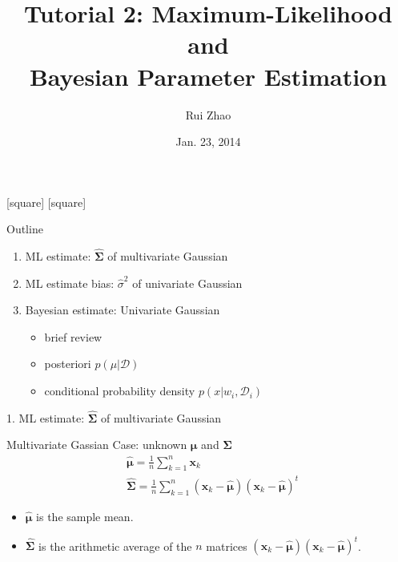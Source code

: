 \documentclass[compress,blue]{beamer}
\title[ENGG 5202 Pattern Recogntion Tutorial 2]{Tutorial 2: Maximum-Likelihood and \\ Bayesian Parameter Estimation}
\author{Rui Zhao}
\institute{rzhao@ee.cuhk.edu.hk}
\date{Jan. 23, 2014}
\newcommand{\bx}{\mathbf{x}}
\newcommand{\bmu}{\mathbf{\mu}}
\newcommand{\bSig}{\mathbf{\Sigma}}
\newcommand{\calD}{\mathcal{D}}
\begin{document}
\begin{frame}
\titlepage
\end{frame}

[square]
[square]

\begin{frame}{Outline}
	\begin{enumerate}
		\item<1-> ML estimate: $\hat{\bSig}$ of multivariate Gaussian 
		\vspace{0.1in}
		\item<2-> ML estimate bias: $\hat{\sigma}^2$ of univariate Gaussian
		\vspace{0.1in}
		\item<3-> Bayesian estimate: Univariate Gaussian
		\begin{itemize}
			\item brief review
			\item posteriori $p(\mu|\calD)$
			\item conditional probability density $p(x | w_i, \calD_i)$
		\end{itemize}
	\end{enumerate}
\end{frame}

\begin{frame}{1. ML estimate: $\hat{\bSig}$ of multivariate Gaussian }
	\begin{block}{Multivariate Gassian Case: unknown $\bmu$ and $\bSig$}
		\begin{align}
			&\hat{\bmu} = \frac{1}{n}\sum_{k=1}^n\bx_k\\
			&\hat{\bSig} = \frac{1}{n}\sum_{k=1}^n(\bx_k - \hat{\bmu})(\bx_k - \hat{\bmu})^t
		\end{align}
		\small
		\begin{itemize}
			\item $\hat{\bmu}$ is the sample mean. 
			\item $\hat{\bSig}$ is the arithmetic average of the $n$ matrices $(\bx_k - \hat{\bmu})(\bx_k - \hat{\bmu})^t$.
		\end{itemize}
		\normalsize
	\end{block}	
\end{frame}
\end{document}
